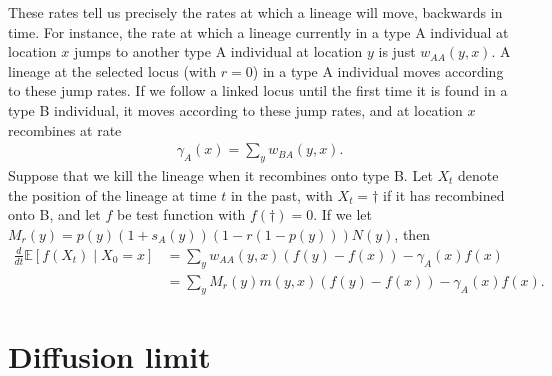 \documentclass{article}
\newcommand{\E}{\mathbb{E}}
\newcommand{\deriv}[1]{\frac{d}{d#1}}
\newcommand{\given}{\;\vert\;}
\begin{document}
These rates tell us precisely the rates at which a lineage will move, backwards in time.
For instance, the rate at which a lineage currently in a type A individual at location $x$
jumps to another type A individual at location $y$ is just $w_{AA}(y,x)$.
A lineage at the selected locus (with $r=0$) in a type A individual moves according to these jump rates.
If we follow a linked locus until the first time it is found in a type B individual,
it moves according to these jump rates, and at location $x$ recombines at rate
\begin{align}
    \gamma_A(x) = \sum_y w_{BA}(y,x) .
\end{align}
Suppose that we kill the lineage when it recombines onto type B.
Let $X_t$ denote the position of the lineage at time $t$ in the past,
with $X_t = \dagger$ if it has recombined onto B,
and let $f$ be test function with $f(\dagger)=0$.
If we let $M_r(y) = p(y) (1+s_A(y)) \left(1 - r (1-p(y)) \right)  N(y)$, then
\begin{align}
    \deriv{t} \E[f(X_t) \given X_0=x ] &= \sum_y w_{AA}(y,x) ( f(y)-f(x) ) - \gamma_A(x) f(x) \\
                                       &= \sum_y  M_r(y) m(y,x) ( f(y) - f(x)  ) - \gamma_A(x) f(x) .
\end{align}

\section{Diffusion limit}
\end{document}
